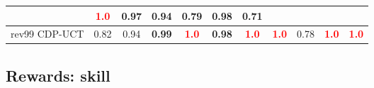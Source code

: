 \documentclass{article}
\begin{document}
\begin{tabular}{|l|r@{$\pm$}rr@{$\pm$}rr@{$\pm$}rr@{$\pm$}rr@{$\pm$}rr@{$\pm$}rr@{$\pm$}rr@{$\pm$}rr@{$\pm$}rr@{$\pm$}r|}
& \multicolumn{2}{c}{\textbf{\textcolor{red}{1.0}}}
& \multicolumn{2}{c}{0.97}
& \multicolumn{2}{c}{0.94}
& \multicolumn{2}{c}{0.79}
& \multicolumn{2}{c}{0.98}
& \multicolumn{2}{c|}{0.71}
\\
\hline
rev99 CDP-UCT
& \multicolumn{2}{c}{0.82}
& \multicolumn{2}{c}{0.94}
& \multicolumn{2}{c}{\textbf{0.99}}
& \multicolumn{2}{c}{\textbf{\textcolor{red}{1.0}}}
& \multicolumn{2}{c}{\textbf{0.98}}
& \multicolumn{2}{c}{\textbf{\textcolor{red}{1.0}}}
& \multicolumn{2}{c}{\textbf{\textcolor{red}{1.0}}}
& \multicolumn{2}{c}{0.78}
& \multicolumn{2}{c}{\textbf{\textcolor{red}{1.0}}}
& \multicolumn{2}{c|}{\textbf{\textcolor{red}{1.0}}}
\\
\hline
\end{tabular}%

\bigskip

\subsection*{Rewards: skill}
\end{document}

